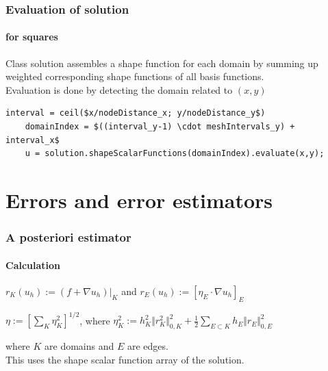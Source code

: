 \documentclass[mathserif]{beamer}
\begin{document}
\begin{frame}[fragile]
	\frametitle{Evaluation of solution}
	\framesubtitle{for squares}
	Class solution assembles a shape function for each domain by summing up weighted corresponding shape functions of all basis functions.\\
	Evaluation is done by detecting the domain related to $(x,y)$
	\begin{lstlisting}[basicstyle=\tiny, mathescape]
	interval = ceil($x/nodeDistance_x; y/nodeDistance_y$)
	domainIndex = $((interval_y-1) \cdot meshIntervals_y) + interval_x$
	u = solution.shapeScalarFunctions(domainIndex).evaluate(x,y);
	\end{lstlisting}
\end{frame}

\section{Errors and error estimators}

\begin{frame}
	\frametitle{A posteriori estimator}
	\framesubtitle{Calculation}
	
$r_K(u_h) := (f+ \nabla u_h)\vert_K$ and $r_E(u_h) := \left[\eta_E \cdot \nabla u_h \right]_E$
	
$\eta := \left[\sum_K \eta_K^2 \right]^{1/2}$, where $\eta_K^2 := h_K^2 \Vert r_K^2 \Vert_{0,K}^2 + \frac{1}{2} \sum_{E \subset K} h_E \Vert r_E \Vert^2_{0,E}$

where $K$ are domains and $E$ are edges.\\
This uses the shape scalar function array of the solution.	
	
\end{frame}
\end{document}
